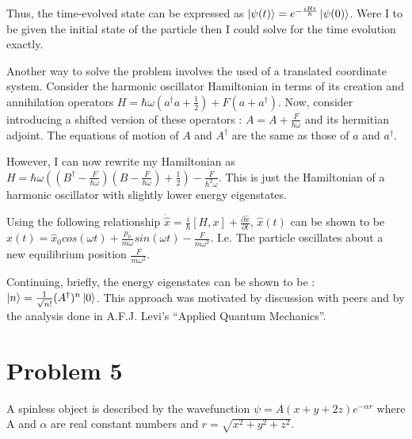 \documentclass[aps,prl,preprint,groupedaddress]{revtex4-1}
\begin{document}
Thus, the time-evolved state can be expressed as $\ket{\psi(t)}=e^{-\frac{iHt}{\hbar}}\ket{\psi(0)}$. Were I to be given the initial state of the particle then I could solve for the time evolution exactly.

Another way to solve the problem involves the used of a translated coordinate system. Consider the harmonic oscillator Hamiltonian in terms of its creation and annihilation operators $H = \hbar \omega (a^\dagger a + \frac{1}{2})+ F (a + a^\dagger)$. Now, consider introducing a shifted version of these operators : $A = A + \frac{F}{\hbar \omega}$ and its hermitian adjoint. The equations of motion of $A$ and $A^\dagger$ are the same as those of $a$ and $a^\dagger$.

However, I can now rewrite my Hamiltonian as $H = \hbar \omega ((B^\dagger - \frac{F}{\hbar \omega})(B-\frac{F}{\hbar \omega})+\frac{1}{2})-\frac{F}{\hbar^2 \omega}$. This is just the Hamiltonian of a harmonic oscillator with slightly lower energy eigenstates.

Using the following relationship $\dot{\hat{x}}=\frac{i}{\hbar}[H,x]+\frac{\partial \hat{x}}{\partial t}$, $\hat{x}(t)$ can be shown to be $x(t)=\hat{x}_0cos(\omega t) + \frac{p_0}{m\omega}sin(\omega t) - \frac{F}{m\omega^2}$. I.e. The particle oscillates about a new equilibrium position $\frac{F}{m\omega^2}$.

Continuing, briefly, the energy eigenstates can be shown to be : $\ket{n}=\frac{1}{\sqrt{n!}}(A^\dagger)^n\ket{0}$. This approach was motivated by discussion with peers and by the analysis done in A.F.J. Levi's ``Applied Quantum Mechanics''.

\section{Problem 5}

A spinless object is described by the wavefunction $\psi = A(x+y+2z)e^{-\alpha r}$ where A and $\alpha$ are real constant numbers and $r=\sqrt{x^2+y^2+z^2}$. 
\end{document}
